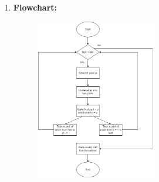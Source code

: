\documentclass[11pt,a4paper]{article}
\begin{document}
{\begin{enumerate}[label=\textbf{\arabic*})]
\begin{algorithm}[H]
\begin{algorithmic}[1]
            			\State set end as pivotIndex
            			\State pIndex = beg - 1
            					\State Swap a[i] and a[pIndex]
            					\State pIndex++
            				\EndIf
            			\EndFor
            			\State Swap pivot and a[pIndex + 1]
            			\State return pIndex + 1
            		\EndProcedure
            	\end{algorithmic}
            \end{algorithm}
				\item \textbf{Flowchart:}
					\begin{figure}[H]
						\centering 
						\includegraphics[width=0.5\textwidth]{QuickSortFlowChart}
					\end{figure}
					

\end{enumerate}}
\end{document}
